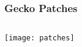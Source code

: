 \documentclass[
	notes=none,
	aspectratio=169
]{beamer}
\begin{document}

\begin{frame}
\frametitle{Gecko Patches}

\begin{columns}[T]
\begin{column}[T]{0.7\textwidth}

\vspace{0.5cm}
\texttt{[image: patches]}

\end{column}
\end{columns}

\end{frame}
\note{
\begin{enumerate}
\item -
\end{enumerate}
}









\end{document}
